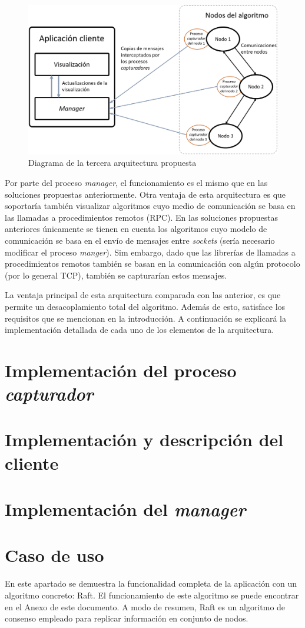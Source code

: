 \begin{figure}[h]
  \centering
  \includegraphics[width=0.7\linewidth]{imagenes/arquitectura3}
  \caption{Diagrama de la tercera arquitectura propuesta}
  \label{fig:arquitectura3}
\end{figure}

Por parte del proceso \textit{manager}, el funcionamiento es el mismo que en las soluciones propuestas anteriormente. Otra ventaja de esta arquitectura es que soportaría también visualizar algoritmos cuyo medio de comunicación se basa en las llamadas a procedimientos remotos (RPC). En las soluciones propuestas anteriores únicamente se tienen en cuenta los algoritmos cuyo modelo de comunicación se basa en el envío de mensajes entre \textit{sockets} (sería necesario modificar el proceso \textit{manger}). Sim embargo, dado que las librerías de llamadas a procedimientos remotos también se basan en la comunicación con algún protocolo (por lo general TCP), también se capturarían estos mensajes.

La ventaja principal de esta arquitectura comparada con las anterior, es que permite un desacoplamiento total del algoritmo. Además de esto, satisface los requisitos que se mencionan en la introducción. A continuación se explicará la implementación detallada de cada uno de los elementos de la arquitectura.

\section{Implementación del proceso \textit{capturador}}

\section{Implementación y descripción del cliente}

\section{Implementación del \textit{manager}}

\section{Caso de uso}

En este apartado se demuestra la funcionalidad completa de la aplicación con un algoritmo concreto: Raft. El funcionamiento de este algoritmo se puede encontrar en el Anexo de este documento. A modo de resumen, Raft es un algoritmo de consenso empleado para replicar información en conjunto de nodos.

